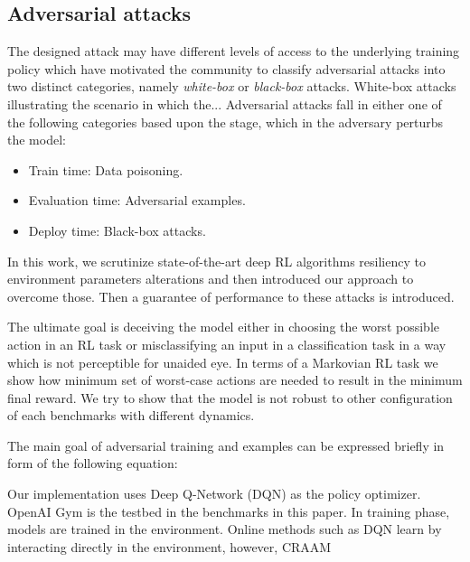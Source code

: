 \documentclass[letterpaper,12pt]{article}
\begin{document}
      \subsection{Adversarial attacks}
    The designed attack may have different levels of access to the underlying training policy which have motivated
    the community to classify adversarial attacks into two distinct categories, namely \textit{white-box} or
    \textit{black-box} attacks. White-box attacks illustrating the scenario in which the... Adversarial attacks fall
    in either one of the following categories based upon the stage, which in the adversary perturbs the model:
    \begin{itemize}
        \item Train time: Data poisoning.
        \item Evaluation time: Adversarial examples.
        \item Deploy time: Black-box attacks.
    \end{itemize}

    In this work, we scrutinize state-of-the-art deep RL algorithms resiliency to environment parameters alterations
     and then introduced our approach to overcome those. Then a guarantee of performance to these attacks is introduced.


    The ultimate goal is deceiving the model either in choosing the worst possible action in an RL task or misclassifying an input in a classification task in a way which is not perceptible for unaided eye. In terms of a Markovian RL task we show how minimum set of worst-case actions are needed to result in the minimum final reward. We try to show that the model is not robust to other configuration of each benchmarks with different dynamics.

    The main goal of adversarial training and examples can be expressed briefly in form of the following equation:

     Our implementation uses Deep Q-Network (DQN)\cite{Mnih2015} as the policy optimizer. OpenAI Gym \cite{Brockman2016} is the testbed in the benchmarks in this paper. In training phase, models are trained in the environment. Online methods such as DQN learn by interacting directly in the environment, however, CRAAM
\end{document}
